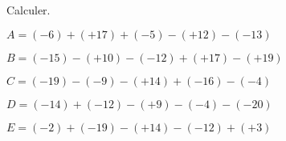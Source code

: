 \begin{exercice*}
    Calculer.
        \begin{list}{}
            \item $ A =  (-6)+(+17)+(-5)-(+12)-(-13) $
            \item $ B =  (-15)-(+10)-(-12)+(+17)-(+19) $
            \item $ C =  (-19)-(-9)-(+14)+(-16)-(-4) $
            \item $ D =  (-14)+(-12)-(+9)-(-4)-(-20) $
            \item $ E =  (-2)+(-19)-(+14)-(-12)+(+3) $
        \end{list}

\end{exercice*}
